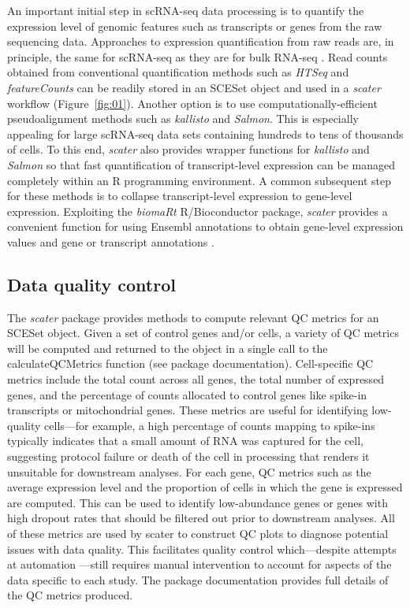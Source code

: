 \documentclass[10pt,letterpaper]{article}
\begin{document}
An important initial step in scRNA-seq data processing is to quantify the expression level of genomic features such as transcripts or genes from the raw sequencing data. Approaches to expression quantification from raw reads are, in principle, the same for scRNA-seq as they are for bulk RNA-seq \citep{Kanitz2015-wp,Teng2016-sc}. Read counts obtained from conventional quantification methods such as \emph{HTSeq} \citep{Anders2015-wf} and \emph{featureCounts} \citep{Liao2014-ui} can be readily stored in an SCESet object and used in a \emph{scater} workflow (Figure~\ref{fig:01}). Another option is to use computationally-efficient pseudoalignment methods such as \emph{kallisto} and \emph{Salmon}. This is especially appealing for large scRNA-seq data sets containing hundreds to tens of thousands of cells. To this end, \emph{scater} also provides wrapper functions for \emph{kallisto} and \emph{Salmon} so that fast quantification of transcript-level expression can be managed completely within an R programming environment. A common subsequent step for these methods is to collapse transcript-level expression to gene-level expression. Exploiting the \emph{biomaRt} R/Bioconductor package, \emph{scater} provides a convenient function for using Ensembl annotations to obtain
gene-level expression values and gene or transcript annotations \citep{Yates2016-ia}.

\subsection*{Data quality control}\label{data-quality-control}

The \emph{scater} package provides methods to compute relevant QC metrics for an SCESet object. Given a set of control genes and/or cells, a variety of QC metrics will be computed and returned to the object in a single call to the calculateQCMetrics function (see package documentation). Cell-specific QC metrics include the total count across all genes, the total number of expressed genes, and the percentage of counts allocated to control genes like spike-in transcripts or mitochondrial genes. These metrics are useful for identifying low-quality cells---for example, a high percentage of counts mapping to spike-ins typically indicates that a small amount of RNA was captured for the cell, suggesting protocol failure or death of the cell in processing that renders it unsuitable for downstream analyses. For each gene, QC metrics such as the average expression level and the proportion of cells in which the gene is expressed are computed. This can be used to identify low-abundance genes or genes with high dropout rates that should be filtered out prior to downstream analyses. All of these metrics are used by scater to construct QC plots to diagnose potential issues with data quality. This facilitates quality control which---despite attempts at automation \citep{Ilicic2016-dm}---still requires manual intervention to account for aspects of the data specific to each study. The package documentation provides full details of the QC metrics produced.
\end{document}
